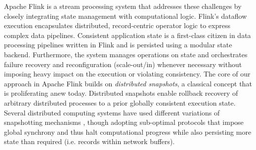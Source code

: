 Apache Flink \cite{CUSTOM:web/Flink} is a stream processing system that addresses these challenges by closely integrating state management with computational logic. Flink's dataflow execution encapsulates distributed, record-centric operator logic to express complex data pipelines. Consistent application state is a first-class citizen in data processing pipelines written in Flink and is persisted using a modular state backend. Furthermore, the system manages operations on state and orchestrates failure recovery and reconfiguration (scale-out/in) whenever necessary without imposing heavy impact on the execution or violating consistency. 
The core of our approach in Apache Flink builds on \emph{distributed snapshots}, a  classical concept that is proliferating anew today. Distributed snapshots enable rollback recovery of arbitrary distributed processes \cite{elnozahy2002survey} to a prior globally consistent execution state. Several distributed computing systems have used different variations of snapshotting mechanisms \cite{murray2013naiad,low2012distributed}, though adopting sub-optimal protocols that impose global synchrony and thus halt computational progress while also persisting more state than required (i.e. records within network buffers).



